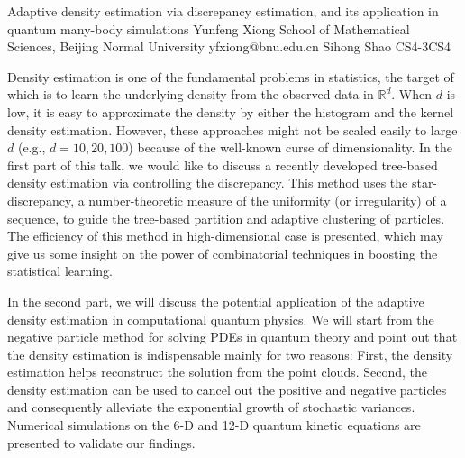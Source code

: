 \begin{talk}
  {Adaptive density estimation via discrepancy estimation, and its application in quantum many-body simulations}%
  {Yunfeng Xiong}%
  {School of Mathematical Sciences, Beijing Normal University}%
  {yfxiong@bnu.edu.cn}%
  {Sihong Shao}%
{}{}{CS4-3}{CS4}


				
				
Density estimation is one of the fundamental problems in statistics, the target of which is to learn the underlying density from the observed data in $\mathbb{R}^d$.  When $d$ is low, it is easy to approximate the density by either the histogram and the kernel density estimation. However, these approaches might not be scaled easily to large $d$ (e.g., $d = 10, 20, 100$) because of the well-known curse of dimensionality. In the first part of this talk, we would like to discuss a recently developed tree-based density estimation via controlling the discrepancy. This method uses the star-discrepancy, a number-theoretic measure of the uniformity (or irregularity) of a sequence, to guide the tree-based partition and adaptive clustering of particles. The efficiency of this method in high-dimensional case is presented, which may give us some insight on the power of combinatorial techniques in boosting the statistical learning.

In the second part, we will discuss the potential application of the adaptive density estimation in computational quantum physics. We will start from the negative particle method for solving PDEs in quantum theory and point out that the density estimation is indispensable mainly for two reasons: First, the density estimation helps reconstruct the solution from the point clouds. Second, the density estimation can be used to cancel out the positive and negative particles and consequently alleviate the exponential growth of stochastic variances. Numerical simulations on the 6-D and 12-D quantum kinetic equations are presented to validate our findings.
\end{talk}

